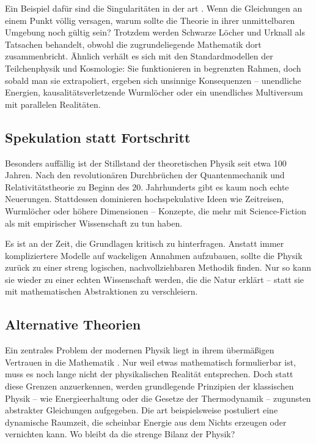 Ein Beispiel dafür sind die Singularitäten in der \gls{art} \cite{Rubcic1998}. Wenn die Gleichungen an einem Punkt völlig versagen, warum sollte die Theorie in ihrer unmittelbaren Umgebung noch gültig sein?
Trotzdem werden Schwarze Löcher und Urknall als Tatsachen behandelt, obwohl die zugrundeliegende Mathematik dort zusammenbricht. Ähnlich verhält es sich mit den Standardmodellen der
Teilchenphysik und Kosmologie: Sie funktionieren in begrenzten Rahmen, doch sobald man sie extrapoliert, ergeben sich unsinnige Konsequenzen – unendliche Energien, kausalitätsverletzende
Wurmlöcher oder ein unendliches Multiversum mit parallelen Realitäten.

\subsection{Spekulation statt Fortschritt}
Besonders auffällig ist der Stillstand der theoretischen Physik seit etwa 100 Jahren. Nach den revolutionären Durchbrüchen der Quantenmechanik und Relativitätstheorie zu Beginn des
20. Jahrhunderts gibt es kaum noch echte Neuerungen. Stattdessen dominieren hochspekulative Ideen wie Zeitreisen, Wurmlöcher oder höhere Dimensionen – Konzepte, die mehr mit
Science-Fiction als mit empirischer Wissenschaft zu tun haben.

Es ist an der Zeit, die Grundlagen kritisch zu hinterfragen. Anstatt immer kompliziertere Modelle auf wackeligen Annahmen aufzubauen, sollte die Physik zurück zu einer streng logischen,
nachvollziehbaren Methodik finden. Nur so kann sie wieder zu einer echten Wissenschaft werden, die die Natur erklärt – statt sie mit mathematischen Abstraktionen zu verschleiern.

\subsection{Alternative Theorien}
Ein zentrales Problem der modernen Physik \cite{Smolin2006, Wesley1990} liegt in ihrem übermäßigen Vertrauen in die Mathematik \cite{Hossenfelder2018}. Nur weil etwas mathematisch formulierbar ist,
muss es noch lange nicht der physikalischen Realität entsprechen. Doch statt diese Grenzen anzuerkennen, werden grundlegende Prinzipien der klassischen Physik – wie Energieerhaltung
oder die Gesetze der Thermodynamik – zugunsten abstrakter Gleichungen aufgegeben. Die \gls{art} beispielsweise postuliert eine dynamische Raumzeit, die scheinbar Energie aus dem Nichts
erzeugen oder vernichten kann. Wo bleibt da die strenge Bilanz der Physik?

